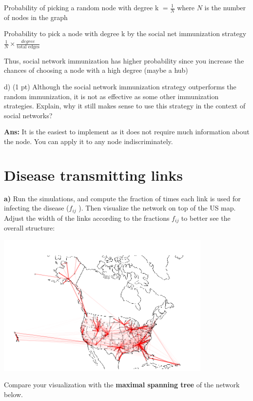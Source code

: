 \documentclass[a4paper,12pt]{article}
\begin{document}
\bigskip
Probability of picking a random node with degree k $= \frac{1}{N}$ where $N$ is the number
of nodes in the graph

\bigskip
Probability to pick a node with degree k by the social net immunization strategy
$\frac{1}{N} \times \frac{degree}{\text{total edges}}$

Thus, social network immunization has higher probability since you increase
the chances of choosing a node
with a high degree (maybe a hub)


\bigskip
d) (1 pt) Although the social network immunization strategy outperforms the random
immunization, it is not as effective as some other immunization strategies.
Explain, why it still makes sense to use this strategy in the context of social networks?

\textbf{Ans: }It is the easiest to implement as it does not require much information about
the node. You can apply it to any node indiscriminately.


\clearpage
\section{Disease transmitting links}

\textbf{a)} Run the simulations, and compute the fraction of times each link is used for infecting
the disease ($f_{ij}$ ). Then visualize the network on top of the US map. Adjust the width of
the links according to the fractions $f_{ij}$ to better see the overall structure:

\begin{center}
  \includegraphics[width=0.8\textwidth]{usa}
\end{center}

Compare your
visualization with the \textbf{maximal spanning tree} of the network below.
\end{document}
